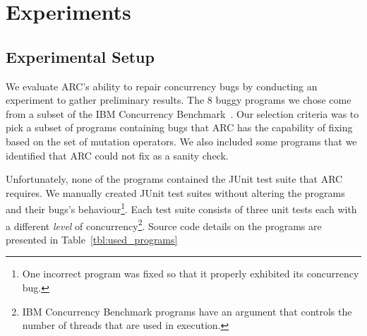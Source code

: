 \section{Experiments}
\label{sec:experiments}


\subsection{Experimental Setup}
\label{sec:experimental_setup}

We evaluate ARC's ability to repair concurrency bugs by conducting an
experiment to gather preliminary results. The 8 buggy programs we chose come
from a subset of the IBM Concurrency Benchmark~\cite{EHSU06}. Our selection
criteria was to pick a subset of programs containing bugs that ARC has the
capability of fixing based on the set of mutation operators. We also included
some programs that we identified that ARC could not fix as a sanity check.

Unfortunately, none of the programs contained the JUnit test suite that ARC
requires. We manually created JUnit test suites without altering the programs
and their bugs's behaviour\footnote{One incorrect program was fixed so that it
properly exhibited its concurrency bug.}. Each test suite consists of three
unit tests each with a different \textit{level} of concurrency\footnote{IBM
Concurrency Benchmark programs have an argument that controls the number of
threads that are used in execution.}. Source code details on the programs are
presented in Table~\ref{tbl:used_programs}

